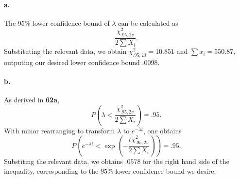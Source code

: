 \documentclass{exam}
\newcommand{\paren}[1]{\left(#1\right)}
\begin{document}
\paragraph{a.} The 95\% lower confidence bound of $\lambda$ can be calculated as 
\[
	\frac{\chi^2_{.95, 2v}}{2\sum X_i}.
\]
Substituting the relevant data, we obtain $\chi^2_{.95, 20} = 10.851$ and $\sum x_i = 550.87$, outputing our desired lower confidence bound .0098.

\paragraph{b.} As derived in \textbf{62a},
\[
	P\paren{\lambda < \frac{\chi^2_{.95, 2v}}{2\sum X_i}} = .95.
\]
With minor rearranging to transform $\lambda$ to $e^{-\lambda t}$, one obtains
\[
	P\paren{e^{-\lambda t} < \exp\paren{-\frac{t\chi^2_{.95, 2v}}{2\sum X_i}}} = .95.
\]
Substiting the relevant data, we obtains $.0578$ for the right hand side of the inequality, corresponding to the $95\%$ lower confidence bound we desire.
\end{document}
